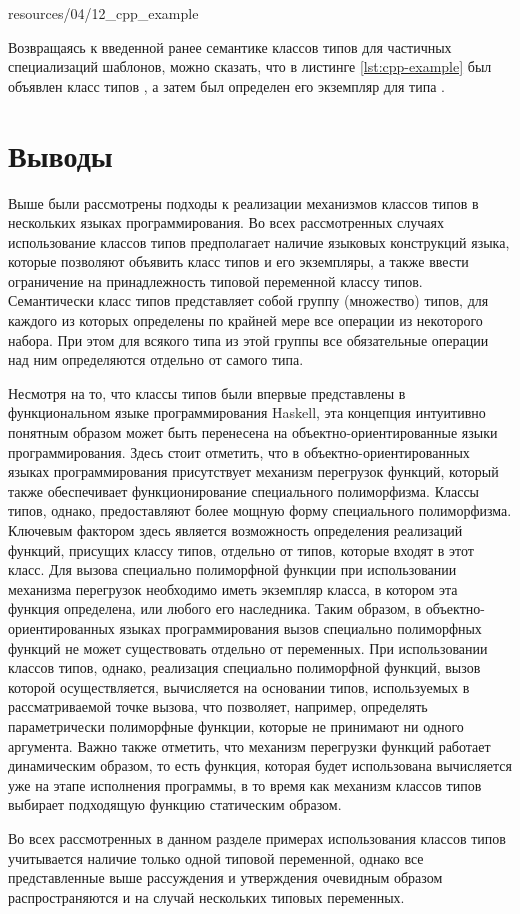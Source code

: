  
{resources/04/12_cpp_example}

Возвращаясь к введенной ранее семантике классов типов для частичных специализаций шаблонов, можно сказать, что в листинге \ref{lst:cpp-example} был объявлен класс типов , а затем был определен его экземпляр для типа . 

\section{Выводы \label{sct:overview-conclusion}}

Выше были рассмотрены подходы к реализации механизмов классов типов в нескольких языках программирования. Во всех рассмотренных случаях использование классов типов предполагает наличие языковых конструкций языка, которые позволяют объявить класс типов и его экземпляры, а также ввести ограничение на принадлежность типовой переменной классу типов. Семантически класс типов представляет собой группу (множество) типов, для каждого из которых определены по крайней мере все операции из некоторого набора. При этом для всякого типа из этой группы все обязательные операции над ним определяются отдельно от самого типа. 

Несмотря на то, что классы типов были впервые представлены в функциональном языке программирования Haskell, эта концепция интуитивно понятным образом может быть перенесена на объектно-ориентированные языки программирования. Здесь стоит отметить, что в объектно-ориентированных языках программирования присутствует механизм перегрузок функций, который также обеспечивает функционирование специального полиморфизма. Классы типов, однако, предоставляют более мощную форму специального полиморфизма. Ключевым фактором здесь является возможность определения реализаций функций, присущих классу типов, отдельно от типов, которые входят в этот класс. Для вызова специально полиморфной функции при использовании механизма перегрузок необходимо иметь экземпляр класса, в котором эта функция определена, или любого его наследника. Таким образом, в объектно-ориентированных языках программирования вызов специально полиморфных функций не может существовать отдельно от переменных. При использовании классов типов, однако, реализация специально полиморфной функций, вызов которой осуществляется, вычисляется на основании типов, используемых в рассматриваемой точке вызова, что позволяет, например, определять параметрически полиморфные функции, которые не принимают ни одного аргумента. Важно также отметить, что механизм перегрузки функций работает динамическим образом, то есть функция, которая будет использована вычисляется уже на этапе исполнения программы, в то время как механизм классов типов выбирает подходящую функцию статическим образом.

Во всех рассмотренных в данном разделе примерах использования классов типов учитывается наличие только одной типовой переменной, однако все представленные выше рассуждения и утверждения очевидным образом распространяются и на случай нескольких типовых переменных.